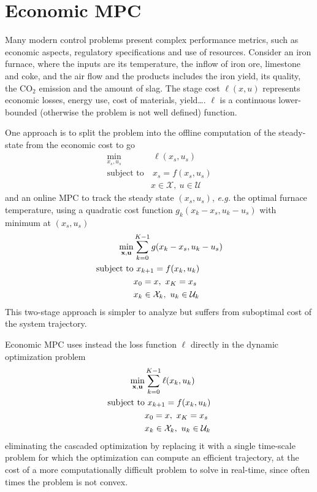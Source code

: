 \section{Economic MPC}
\label{sec:economic-mpc}

Many modern control problems present complex performance metrics, such as economic aspects, regulatory specifications and use of resources. Consider an iron furnace, where the inputs are its temperature, the inflow of iron ore, limestone and coke, and the air flow and the products includes the iron yield, its quality, the CO$_2$ emission and the amount of slag. The stage cost $\ell(x,u)$ represents economic losses, energy use, cost of materials, yield\ldots. $\ell$ is a continuous lower-bounded (otherwise the problem is not well defined) function.

One approach is to split the problem into the offline computation of the steady-state from the economic cost to go
\begin{align*}
  \min_{x_s,u_s} &\ \ell(x_s,u_s) \\
  \text{subject to} &\ x_s = f(x_s,u_s) \\
                 & x\in \mathcal{X},\ u\in \mathcal{U}
\end{align*}
and an online MPC to track the steady state $(x_s,u_s)$, \textit{e.g.} the optimal furnace temperature, using a quadratic cost function $g_k(x_k-x_s,u_k-u_s)$ with minimum at $(x_s,u_s)$
\begin{align*}
  \min_{\boldsymbol{\mathrm{x}},\boldsymbol{\mathrm{u}}} & \sum_{k=0}^{K-1} g(x_k-x_s,u_k-u_s) \\
  \text{subject to} &\ x_{k+1} = f(x_k,u_k) \\
                   & x_0 = x,\ x_K=x_s \\
                   & x_k\in \mathcal{X}_k,\ u_k\in \mathcal{U}_k
\end{align*}
This two-stage approach is simpler to analyze but suffers from suboptimal cost of the system trajectory.

Economic MPC uses instead the loss function $\ell$ directly in the dynamic optimization problem
\begin{align*}
  \min_{\boldsymbol{\mathrm{x}},\boldsymbol{\mathrm{u}}} & \sum_{k=0}^{K-1} \ell(x_k,u_k) \\
  \text{subject to} &\ x_{k+1} = f(x_k,u_k) \\
                   & x_0 = x,\ x_K=x_s \\
                   & x_k\in \mathcal{X}_k,\ u_k\in \mathcal{U}_k
\end{align*}
eliminating the cascaded optimization by replacing it with a single time-scale problem for which the optimization can compute an efficient trajectory, at the cost of a more computationally difficult problem to solve in real-time, since often times the problem is not convex.

